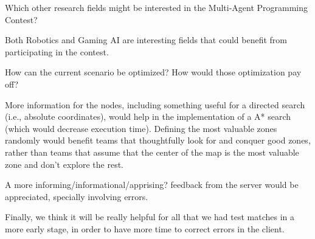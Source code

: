 \begin{question}
Which other research fields might be interested in the Multi-Agent
Programming Contest?
\end{question}
Both Robotics and Gaming AI are interesting fields that could benefit from
participating in the contest.

\begin{question}
How can the current scenario be optimized? How would those optimization pay
off?
\end{question}

    More information for the nodes, including something useful for a directed
    search (i.e., absolute coordinates), would help in
    the implementation of a A* search (which would decrease execution time).
    Defining the most valuable zones randomly would benefit teams that
    thoughtfully look for and conquer good zones, rather than teams that assume
    that the center of the map is the most valuable zone and don't explore the
    rest.

    A more informing/informational/apprising? feedback from the server would
    be appreciated, specially involving errors.

    Finally, we think it will be really helpful for all that we had test
    matches in a more early stage, in order to have more time to correct
    errors in the client.
